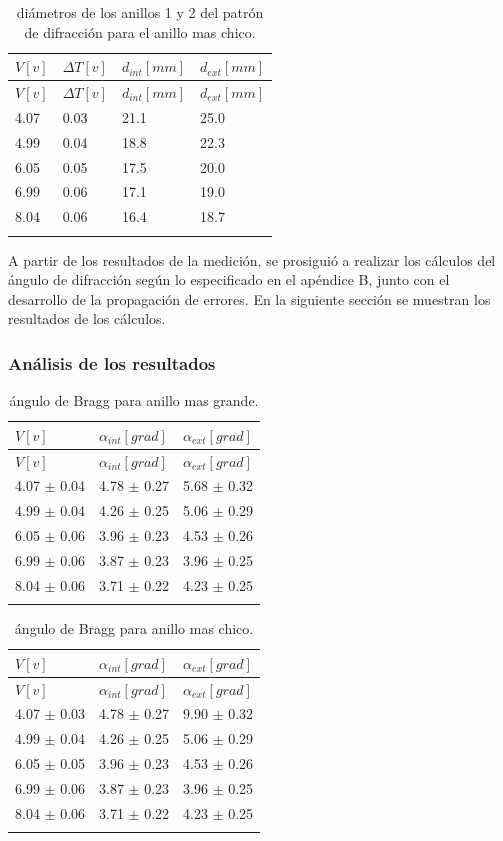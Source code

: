\documentclass[]{article}
\begin{document}
\begin{longtable}[]{@{}llll@{}}
\toprule
\(V[v]\) & \(\Delta T[v]\) & \(d_{int}[mm]\) &
\(d_{ext}[mm]\)\tabularnewline
\midrule
\endfirsthead
\toprule
\(V[v]\) & \(\Delta T[v]\) & \(d_{int}[mm]\) &
\(d_{ext}[mm]\)\tabularnewline
\midrule
\endhead
4.07 & 0.03 & 21.1 & 25.0\tabularnewline
4.99 & 0.04 & 18.8 & 22.3\tabularnewline
6.05 & 0.05 & 17.5 & 20.0\tabularnewline
6.99 & 0.06 & 17.1 & 19.0\tabularnewline
8.04 & 0.06 & 16.4 & 18.7\tabularnewline
\bottomrule
\caption{diámetros de los anillos 1 y 2 del patrón de difracción para el
anillo mas chico.}\tabularnewline
\end{longtable}

A partir de los resultados de la medición, se prosiguió a realizar los
cálculos del ángulo de difracción según lo especificado en el apéndice
B, junto con el desarrollo de la propagación de errores. En la siguiente
sección se muestran los resultados de los cálculos.

\hypertarget{anuxe1lisis-de-los-resultados}{%
\subsubsection{Análisis de los
resultados}\label{anuxe1lisis-de-los-resultados}}

\begin{longtable}[]{@{}lll@{}}
\toprule
\(V[v]\) & \(\alpha_{int} [grad]\) &
\(\alpha_{ext} [grad]\)\tabularnewline
\midrule
\endfirsthead
\toprule
\(V[v]\) & \(\alpha_{int} [grad]\) &
\(\alpha_{ext} [grad]\)\tabularnewline
\midrule
\endhead
4.07 \(\pm\) 0.04 & 4.78 \(\pm\) 0.27 & 5.68 \(\pm\) 0.32\tabularnewline
4.99 \(\pm\) 0.04 & 4.26 \(\pm\) 0.25 & 5.06 \(\pm\) 0.29\tabularnewline
6.05 \(\pm\) 0.06 & 3.96 \(\pm\) 0.23 & 4.53 \(\pm\) 0.26\tabularnewline
6.99 \(\pm\) 0.06 & 3.87 \(\pm\) 0.23 & 3.96 \(\pm\) 0.25\tabularnewline
8.04 \(\pm\) 0.06 & 3.71 \(\pm\) 0.22 & 4.23 \(\pm\) 0.25\tabularnewline
\bottomrule
\caption{ángulo de Bragg para anillo mas grande.}\tabularnewline
\end{longtable}

\begin{longtable}[]{@{}lll@{}}
\toprule
\(V[v]\) & \(\alpha_{int} [grad]\) &
\(\alpha_{ext} [grad]\)\tabularnewline
\midrule
\endfirsthead
\toprule
\(V[v]\) & \(\alpha_{int} [grad]\) &
\(\alpha_{ext} [grad]\)\tabularnewline
\midrule
\endhead
4.07 \(\pm\) 0.03 & 4.78 \(\pm\) 0.27 & 9.90 \(\pm\) 0.32\tabularnewline
4.99 \(\pm\) 0.04 & 4.26 \(\pm\) 0.25 & 5.06 \(\pm\) 0.29\tabularnewline
6.05 \(\pm\) 0.05 & 3.96 \(\pm\) 0.23 & 4.53 \(\pm\) 0.26\tabularnewline
6.99 \(\pm\) 0.06 & 3.87 \(\pm\) 0.23 & 3.96 \(\pm\) 0.25\tabularnewline
8.04 \(\pm\) 0.06 & 3.71 \(\pm\) 0.22 & 4.23 \(\pm\) 0.25\tabularnewline
\bottomrule
\caption{ángulo de Bragg para anillo mas chico.}\tabularnewline
\end{longtable}
\end{document}
